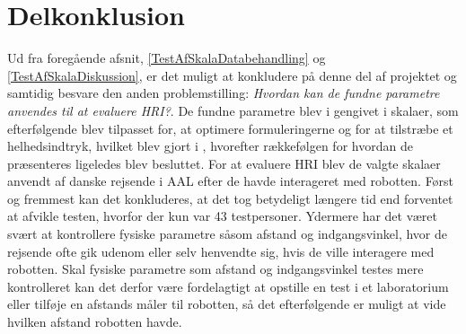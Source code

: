 \chapter{Delkonklusion}
\label{TestAfSkalaDelKonklusion}
%
Ud fra foregående afsnit, \autoref{TestAfSkalaDatabehandling} og \autoref{TestAfSkalaDiskussion}, er det muligt at konkludere på denne del af projektet og samtidig besvare den anden problemstilling: \textit{Hvordan kan de fundne parametre anvendes til at evaluere HRI?}. De fundne parametre blev i  gengivet i skalaer, som efterfølgende blev tilpasset for, at optimere formuleringerne og for at tilstræbe et helhedsindtryk, hvilket blev gjort i , hvorefter rækkefølgen for hvordan de præsenteres ligeledes blev besluttet. For at evaluere HRI blev de valgte skalaer anvendt af danske rejsende i AAL efter de havde interageret med robotten.\blankline 
%
Først og fremmest kan det konkluderes, at det tog betydeligt længere tid end forventet at afvikle testen, hvorfor der kun var 43 testpersoner. Ydermere har det været svært at kontrollere fysiske parametre såsom afstand og indgangsvinkel, hvor de rejsende ofte gik udenom eller selv henvendte sig, hvis de ville interagere med robotten. Skal fysiske parametre som afstand og indgangsvinkel testes mere kontrolleret kan det derfor være fordelagtigt at opstille en test i et laboratorium eller tilføje en afstands måler til robotten, så det efterfølgende er muligt at vide hvilken afstand robotten havde.

